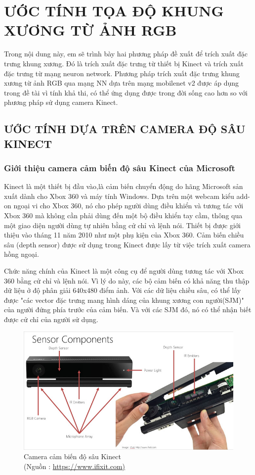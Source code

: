 \chapter{ƯỚC TÍNH TỌA ĐỘ KHUNG XƯƠNG TỪ ẢNH RGB}
\label{s:pose estimate}
Trong nội dung này, em sẽ trình bày hai phương pháp đề xuất để trích xuất đặc trưng khung xương. Đó là trích xuất đặc trưng từ thiết bị Kinect và trích xuất đặc trưng từ mạng neuron network. Phương pháp trích xuất đặc trưng khung xương từ ảnh RGB qua mạng NN dựa trên mạng mobilenet v2 được áp dụng trong đề tài vì tính khả thi, có thể ứng dụng được trong đời sống cao hơn so với phương pháp sử dụng camera Kinect.

\section{ƯỚC TÍNH DỰA TRÊN CAMERA ĐỘ SÂU KINECT}
\label{ss:kinect}
\subsection{Giới thiệu camera cảm biến độ sâu Kinect của Microsoft}
Kinect là một thiết bị đầu vào,là cảm biến chuyển động do hãng Microsoft sản xuất dành cho Xbox 360 và máy tính Windows. Dựa trên một webcam kiểu add-on ngoại vi cho Xbox 360, nó cho phép người dùng điều khiển và tương tác với Xbox 360 mà không cần phải dùng đến một bộ điều khiển tay cầm, thông qua một giao diện người dùng tự nhiên bằng cử chỉ và lệnh nói. Thiết bị được giới thiệu vào tháng 11 năm 2010 như một phụ kiện của Xbox 360. Cảm biến chiều sâu (depth sensor) được sử dụng trong Kinect được lấy từ việc trích xuất camera hồng ngoại. 

Chức năng chính của Kinect là một công cụ để người dùng tương tác với Xbox 360 bằng cử chỉ và lệnh nói. Vì lý do này, các bộ cảm biến có khả năng thu thập dữ liệu ở độ phân giải 640x480 điểm ảnh. Với các dữ liệu chiều sâu, có thể lấy được "các vector đặc trưng mang hình dáng của khung xương con người(SJM)" của người đứng phía trước của cảm biến. Và với các SJM đó, nó có thể nhận biết được cử chỉ của người sử dụng.

\FloatBarrier
\begin{figure}[htp]
\begin{center}
\includegraphics[scale=0.8]{chap3/c3_figs/kinect.png}
\end{center}
\caption{Camera cảm biến độ sâu Kinect \\(Nguồn : \url{https://www.ifixit.com)}}
\label{fig:kinect}
\end{figure}
\FloatBarrier

